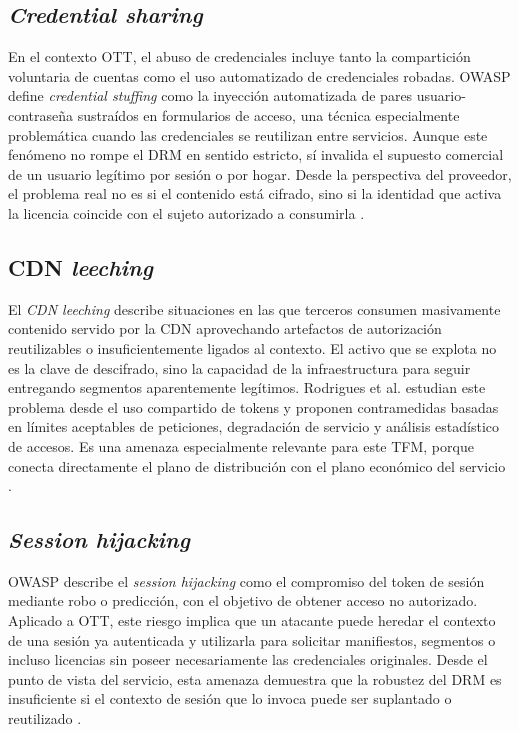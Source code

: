 \subsection{\textit{Credential sharing}}

En el contexto OTT, el abuso de credenciales incluye tanto la compartición voluntaria de cuentas como el uso automatizado de credenciales robadas. OWASP define \textit{credential stuffing} como la inyección automatizada de pares usuario-contraseña sustraídos en formularios de acceso, una técnica especialmente problemática cuando las credenciales se reutilizan entre servicios. Aunque este fenómeno no rompe el DRM en sentido estricto, sí invalida el supuesto comercial de un usuario legítimo por sesión o por hogar. Desde la perspectiva del proveedor, el problema real no es si el contenido está cifrado, sino si la identidad que activa la licencia coincide con el sujeto autorizado a consumirla \cite{owasp-credential-stuffing,rodrigues2024cdn}.

\subsection{CDN \textit{leeching}}

El \textit{CDN leeching} describe situaciones en las que terceros consumen masivamente contenido servido por la CDN aprovechando artefactos de autorización reutilizables o insuficientemente ligados al contexto. El activo que se explota no es la clave de descifrado, sino la capacidad de la infraestructura para seguir entregando segmentos aparentemente legítimos. Rodrigues et al. estudian este problema desde el uso compartido de tokens y proponen contramedidas basadas en límites aceptables de peticiones, degradación de servicio y análisis estadístico de accesos. Es una amenaza especialmente relevante para este TFM, porque conecta directamente el plano de distribución con el plano económico del servicio \cite{rodrigues2024cdn}.

\subsection{\textit{Session hijacking}}

OWASP describe el \textit{session hijacking} como el compromiso del token de sesión mediante robo o predicción, con el objetivo de obtener acceso no autorizado. Aplicado a OTT, este riesgo implica que un atacante puede heredar el contexto de una sesión ya autenticada y utilizarla para solicitar manifiestos, segmentos o incluso licencias sin poseer necesariamente las credenciales originales. Desde el punto de vista del servicio, esta amenaza demuestra que la robustez del DRM es insuficiente si el contexto de sesión que lo invoca puede ser suplantado o reutilizado \cite{owasp-session-hijacking}.


